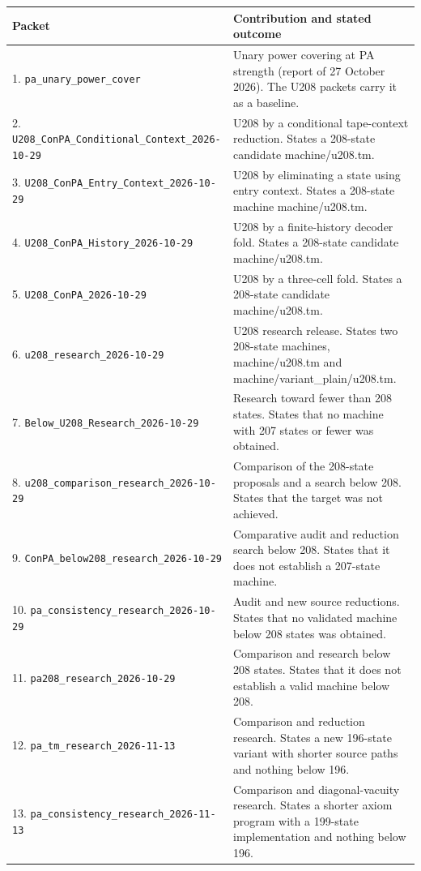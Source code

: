 \begingroup\small
\begin{longtable}{@{}p{.37\linewidth}p{.59\linewidth}@{}}
\toprule Packet & Contribution and stated outcome\\\midrule\endhead
1. \nolinkurl{pa_unary_power_cover} & Unary power covering at PA strength (report of 27 October 2026). The U208 packets carry it as a baseline.\\[4pt]
2. \nolinkurl{U208_ConPA_Conditional_Context_2026-10-29} & U208 by a conditional tape-context reduction. States a 208-state candidate machine/u208.tm.\\[4pt]
3. \nolinkurl{U208_ConPA_Entry_Context_2026-10-29} & U208 by eliminating a state using entry context. States a 208-state machine machine/u208.tm.\\[4pt]
4. \nolinkurl{U208_ConPA_History_2026-10-29} & U208 by a finite-history decoder fold. States a 208-state candidate machine/u208.tm.\\[4pt]
5. \nolinkurl{U208_ConPA_2026-10-29} & U208 by a three-cell fold. States a 208-state candidate machine/u208.tm.\\[4pt]
6. \nolinkurl{u208_research_2026-10-29} & U208 research release. States two 208-state machines, machine/u208.tm and machine/variant\_plain/u208.tm.\\[4pt]
7. \nolinkurl{Below_U208_Research_2026-10-29} & Research toward fewer than 208 states. States that no machine with 207 states or fewer was obtained.\\[4pt]
8. \nolinkurl{u208_comparison_research_2026-10-29} & Comparison of the 208-state proposals and a search below 208. States that the target was not achieved.\\[4pt]
9. \nolinkurl{ConPA_below208_research_2026-10-29} & Comparative audit and reduction search below 208. States that it does not establish a 207-state machine.\\[4pt]
10. \nolinkurl{pa_consistency_research_2026-10-29} & Audit and new source reductions. States that no validated machine below 208 states was obtained.\\[4pt]
11. \nolinkurl{pa208_research_2026-10-29} & Comparison and research below 208 states. States that it does not establish a valid machine below 208.\\[4pt]
12. \nolinkurl{pa_tm_research_2026-11-13} & Comparison and reduction research. States a new 196-state variant with shorter source paths and nothing below 196.\\[4pt]
13. \nolinkurl{pa_consistency_research_2026-11-13} & Comparison and diagonal-vacuity research. States a shorter axiom program with a 199-state implementation and nothing below 196.\\[4pt]

\end{longtable}
